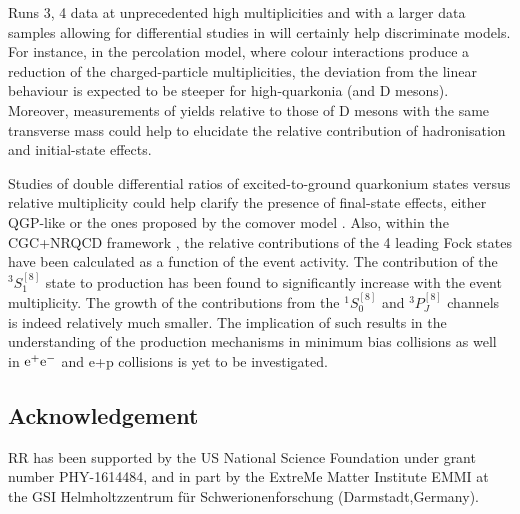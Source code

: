 \documentclass[../report.tex]{subfiles}
\begin{document}
Runs 3, 4 data at unprecedented high multiplicities and with a larger data samples allowing for differential studies in \pT will certainly help discriminate models.
For instance, in the percolation model, where colour interactions produce a reduction of the charged-particle multiplicities, the deviation from the linear behaviour is expected to be steeper for high-\pT quarkonia (and D mesons).
Moreover, measurements of \PJgy  yields relative to those of D mesons with the same transverse mass could help to elucidate the relative contribution of hadronisation and initial-state effects.

Studies of double differential ratios of excited-to-ground quarkonium states versus relative multiplicity could help clarify the presence of final-state effects, either QGP-like or the ones proposed by the comover model \cite{Ferreiro:2014bia,Ferreiro:2018wbd}.
Also, within the CGC+NRQCD framework \cite{Ma:2018bax}, the relative contributions of the 4 leading \PJgy Fock states have been calculated as a function of the event activity.
The contribution of the $^3S_1^{[8]}$ state to \PJgy production has been found to significantly increase with the event multiplicity. The growth of the contributions from the $^1S_0^{[8]}$  and $^3P_J^{[8]}$ channels is indeed relatively much smaller. The implication of such results in the understanding of the production mechanisms in minimum bias \pp collisions as well in  ${\rm e}^+{\rm e}^-$ and e+p collisions is yet to be investigated. 


\subsection*{Acknowledgement}
RR has been supported by the US National Science Foundation under
grant number PHY-1614484, and in part by the ExtreMe Matter Institute EMMI at 
the GSI Helmholtzzentrum f\"{u}r Schwerionenforschung (Darmstadt,Germany).
\end{document}
